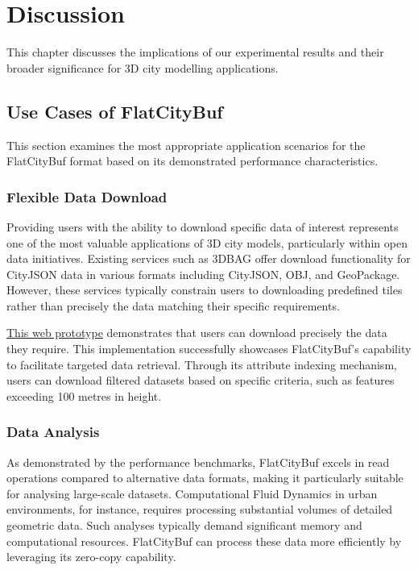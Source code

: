 \chapter{Discussion}
\label{chp:discussion}

This chapter discusses the implications of our experimental results and their broader significance for 3D city modelling applications.

\section{Use Cases of FlatCityBuf}
\label{use_case_flat_city_buffer}

This section examines the most appropriate application scenarios for the FlatCityBuf format based on its demonstrated performance characteristics.

\subsection{Flexible Data Download}
\label{flexible_data_download}

Providing users with the ability to download specific data of interest represents one of the most valuable applications of 3D city models, particularly within open data initiatives. Existing services such as 3DBAG offer download functionality for CityJSON data in various formats including CityJSON, OBJ, and GeoPackage. However, these services typically constrain users to downloading predefined tiles rather than precisely the data matching their specific requirements.

\href{https://fcb-web-prototype.netlify.app}{This web prototype} demonstrates that users can download precisely the data they require. This implementation successfully showcases FlatCityBuf's capability to facilitate targeted data retrieval. Through its attribute indexing mechanism, users can download filtered datasets based on specific criteria, such as features exceeding 100 metres in height.

\subsection{Data Analysis}
\label{data_analysis}
As demonstrated by the performance benchmarks, FlatCityBuf excels in read operations compared to alternative data formats, making it particularly suitable for analysing large-scale datasets. Computational Fluid Dynamics in urban environments, for instance, requires processing substantial volumes of detailed geometric data. Such analyses typically demand significant memory and computational resources. FlatCityBuf can process these data more efficiently by leveraging its zero-copy capability.

